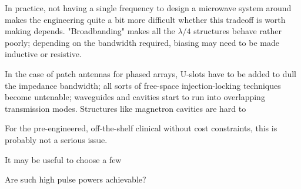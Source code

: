 \documentclass[paper.tex]{subfiles}
\begin{document}
In practice, not having a single frequency to design a microwave system around makes the engineering quite a bit more difficult whether this tradeoff is worth making depends. "Broadbanding" makes all the $\lambda / 4$ structures behave rather poorly; depending on the bandwidth required, biasing may need to be made inductive or resistive.

In the case of patch antennas for phased arrays, U-slots have to be added to dull the impedance bandwidth; all sorts of free-space injection-locking techniques become untenable; waveguides and cavities start to run into overlapping transmission modes. Structures like magnetron cavities are hard to 

For the pre-engineered, off-the-shelf clinical without cost constraints, this is probably not a serious issue.

It may be useful to choose a few 

Are such high pulse powers achievable? 




	
\end{document}
